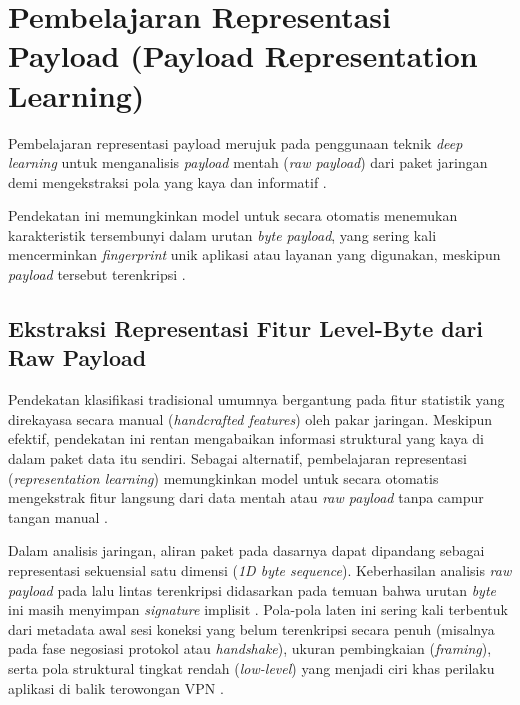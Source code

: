 \section{Pembelajaran Representasi Payload (Payload Representation Learning)}
\label{sec:bab2-payload-learning}

Pembelajaran representasi payload merujuk pada penggunaan teknik \textit{deep learning} untuk menganalisis \textit{payload} mentah (\textit{raw payload}) dari paket jaringan demi mengekstraksi pola yang kaya dan informatif \citep{Razooqi2025, Lotfollahi2019}. 

Pendekatan ini memungkinkan model untuk secara otomatis menemukan karakteristik tersembunyi dalam urutan \textit{byte payload}, yang sering kali mencerminkan \textit{fingerprint} unik aplikasi atau layanan yang digunakan, meskipun \textit{payload} tersebut terenkripsi \citep{nie2025iot, Stein2024}.

\subsection{Ekstraksi Representasi Fitur Level-Byte dari Raw Payload}

Pendekatan klasifikasi tradisional umumnya bergantung pada fitur statistik yang direkayasa secara manual (\textit{handcrafted features}) oleh pakar jaringan. Meskipun efektif, pendekatan ini rentan mengabaikan informasi struktural yang kaya di dalam paket data itu sendiri. Sebagai alternatif, pembelajaran representasi (\textit{representation learning}) memungkinkan model untuk secara otomatis mengekstrak fitur langsung dari data mentah atau \textit{raw payload} tanpa campur tangan manual \citep{sharma2024survey}.

Dalam analisis jaringan, aliran paket pada dasarnya dapat dipandang sebagai representasi sekuensial satu dimensi (\textit{1D byte sequence}). Keberhasilan analisis \textit{raw payload} pada lalu lintas terenkripsi didasarkan pada temuan bahwa urutan \textit{byte} ini masih menyimpan \textit{signature} implisit \citep{razooqi2025vpn}. Pola-pola laten ini sering kali terbentuk dari metadata awal sesi koneksi yang belum terenkripsi secara penuh (misalnya pada fase negosiasi protokol atau \textit{handshake}), ukuran pembingkaian (\textit{framing}), serta pola struktural tingkat rendah (\textit{low-level}) yang menjadi ciri khas perilaku aplikasi di balik terowongan VPN \citep{Lotfollahi2019}. 

